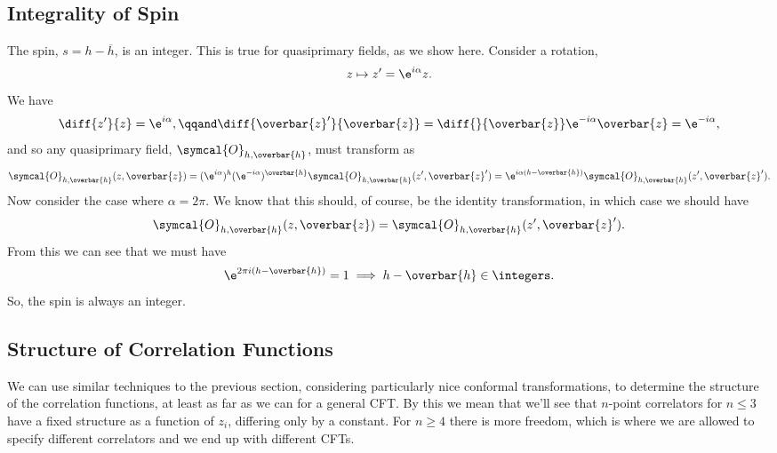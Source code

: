 \documentclass[fleqn]{NotesClass}
\newcommand{\quantumField}[1]{\symcal{#1}}
\begin{document}
    \subsection{Integrality of Spin}
    The spin, \(s = h - \overbar{h}\), is an integer.
    This is true for quasiprimary fields, as we show here.
    Consider a rotation,
    \begin{equation}
        z \mapsto z' = \e^{i\alpha} z.
    \end{equation}
    We have
    \begin{equation}
        \diff{z'}{z} = \e^{i\alpha}, \qqand \diff{\overbar{z}'}{\overbar{z}} = \diff{}{\overbar{z}} \e^{-i\alpha}\overbar{z} = \e^{-i\alpha},
    \end{equation}
    and so any quasiprimary field, \(\quantumField{O}_{h,\overbar{h}}\), must transform as
    \begin{equation}
        \quantumField{O}_{h,\overbar{h}}(z, \overbar{z}) = (\e^{i\alpha})^h (\e^{-i\alpha})^{\overbar{h}} \quantumField{O}_{h,\overbar{h}}(z', \overbar{z}') = \e^{i\alpha(h - \overbar{h})} \quantumField{O}_{h,\overbar{h}}(z', \overbar{z}').
    \end{equation}
    Now consider the case where \(\alpha = 2\pi\).
    We know that this should, of course, be the identity transformation, in which case we should have
    \begin{equation}
        \quantumField{O}_{h,\overbar{h}}(z, \overbar{z}) = \quantumField{O}_{h,\overbar{h}}(z', \overbar{z}').
    \end{equation}
    From this we can see that we must have
    \begin{equation}
        \e^{2\pi i(h - \overbar{h})} = 1 \implies h - \overbar{h} \in \integers.
    \end{equation}
    So, the spin is always an integer.
    
    \subsection{Structure of Correlation Functions}
    We can use similar techniques to the previous section, considering particularly nice conformal transformations, to determine the structure of the correlation functions, at least as far as we can for a general CFT.
    By this we mean that we'll see that \(n\)-point correlators for \(n \le 3\) have a fixed structure as a function of \(z_i\), differing only by a constant.
    For \(n \ge 4\) there is more freedom, which is where we are allowed to specify different correlators and we end up with different CFTs.
    
\end{document}
